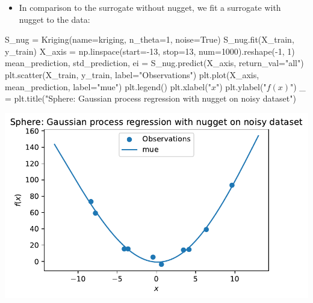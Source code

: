 \documentclass[
  letterpaper,
  DIV=11,
  numbers=noendperiod]{scrreprt}
\newenvironment{Shaded}{\begin{snugshade}}{\end{snugshade}}
\newcommand{\DecValTok}[1]{\textcolor[rgb]{0.68,0.00,0.00}{#1}}
\newcommand{\NormalTok}[1]{\textcolor[rgb]{0.00,0.23,0.31}{#1}}
\newcommand{\OperatorTok}[1]{\textcolor[rgb]{0.37,0.37,0.37}{#1}}
\newcommand{\StringTok}[1]{\textcolor[rgb]{0.13,0.47,0.30}{#1}}
\newcommand{\VariableTok}[1]{\textcolor[rgb]{0.07,0.07,0.07}{#1}}
\providecommand{\tightlist}{%
  \setlength{\itemsep}{0pt}\setlength{\parskip}{0pt}}\usepackage{longtable,booktabs,array}
\begin{document}
\begin{itemize}
\tightlist
\item
  In comparison to the surrogate without nugget, we fit a surrogate with
  nugget to the data:
\end{itemize}

\begin{Shaded}
\begin{Highlighting}[]
\NormalTok{S\_nug }\OperatorTok{=}\NormalTok{ Kriging(name}\OperatorTok{=}\StringTok{\textquotesingle{}kriging\textquotesingle{}}\NormalTok{,}
\NormalTok{            n\_theta}\OperatorTok{=}\DecValTok{1}\NormalTok{,}
\NormalTok{            noise}\OperatorTok{=}\VariableTok{True}\NormalTok{)}
\NormalTok{S\_nug.fit(X\_train, y\_train)}
\NormalTok{X\_axis }\OperatorTok{=}\NormalTok{ np.linspace(start}\OperatorTok{={-}}\DecValTok{13}\NormalTok{, stop}\OperatorTok{=}\DecValTok{13}\NormalTok{, num}\OperatorTok{=}\DecValTok{1000}\NormalTok{).reshape(}\OperatorTok{{-}}\DecValTok{1}\NormalTok{, }\DecValTok{1}\NormalTok{)}
\NormalTok{mean\_prediction, std\_prediction, ei }\OperatorTok{=}\NormalTok{ S\_nug.predict(X\_axis, return\_val}\OperatorTok{=}\StringTok{"all"}\NormalTok{)}
\NormalTok{plt.scatter(X\_train, y\_train, label}\OperatorTok{=}\StringTok{"Observations"}\NormalTok{)}
\NormalTok{plt.plot(X\_axis, mean\_prediction, label}\OperatorTok{=}\StringTok{"mue"}\NormalTok{)}
\NormalTok{plt.legend()}
\NormalTok{plt.xlabel(}\StringTok{"$x$"}\NormalTok{)}
\NormalTok{plt.ylabel(}\StringTok{"$f(x)$"}\NormalTok{)}
\NormalTok{\_ }\OperatorTok{=}\NormalTok{ plt.title(}\StringTok{"Sphere: Gaussian process regression with nugget on noisy dataset"}\NormalTok{)}
\end{Highlighting}
\end{Shaded}

\includegraphics{013_num_spot_noisy_files/figure-pdf/cell-15-output-1.pdf}
\end{document}
